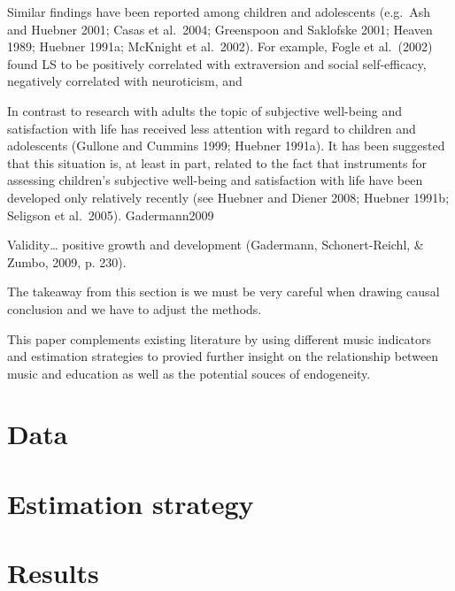 \documentclass[a4, 12pt]{article}
\begin{document}
Similar findings have been reported among children and adolescents (e.g.~Ash
and Huebner 2001; Casas et al.~2004; Greenspoon and Saklofske 2001; Heaven 1989;
Huebner 1991a; McKnight et al.~2002). For example, Fogle et al.~(2002) found LS to be
positively correlated with extraversion and social self-efficacy, negatively correlated with
neuroticism, and

In contrast to research with adults the topic of subjective well-being and satisfaction
with life has received less attention with regard to children and adolescents (Gullone and
Cummins 1999; Huebner 1991a). It has been suggested that this situation is, at least in part,
related to the fact that instruments for assessing children's subjective well-being and
satisfaction with life have been developed only relatively recently (see Huebner and Diener
2008; Huebner 1991b; Seligson et al.~2005). Gadermann2009

Validity\ldots{} positive growth and development (Gadermann, Schonert-Reichl, \& Zumbo, 2009, p. 230).

The takeaway from this section is we must be very careful when drawing causal conclusion and we have to adjust the methods.

This paper complements existing literature by using different music indicators and estimation strategies to provied further insight on the relationship between music and education as well as the potential souces of endogeneity.

\clearpage

\hypertarget{data}{%
\section{Data}\label{data}}

\label{sec:data}

\clearpage

\hypertarget{estimation-strategy}{%
\section{Estimation strategy}\label{estimation-strategy}}

\label{sec:estimation_strategy}

\clearpage

\hypertarget{results}{%
\section{Results}\label{results}}
\end{document}
